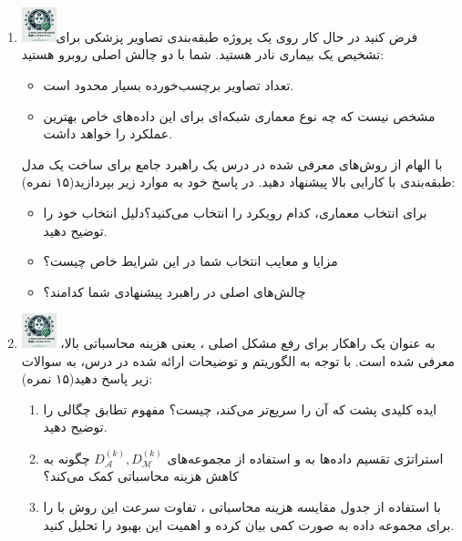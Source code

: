 \documentclass[12pt]{article}
\begin{document}
\begin{enumerate}
    \item \includegraphics[width=1cm]{figs/Allowed_recommended.jpg}فرض کنید در حال کار روی یک پروژه طبقه‌بندی تصاویر پزشکی برای تشخیص یک بیماری نادر هستید. شما با دو چالش اصلی روبرو هستید:
        \begin{itemize}
            \item تعداد تصاویر برچسب‌خورده بسیار محدود است.
            \item مشخص نیست که چه نوع معماری شبکه‌ای برای این داده‌های خاص بهترین عملکرد را خواهد داشت.
        \end{itemize}
        با الهام از روش‌های معرفی شده در درس یک راهبرد جامع برای ساخت یک مدل طبقه‌بندی با کارایی بالا پیشنهاد دهید. در پاسخ خود به موارد زیر بپردازید(۱۵ نمره):
        \begin{itemize}
            \item برای انتخاب معماری، کدام رویکرد را انتخاب می‌کنید؟دلیل انتخاب خود را توضیح دهید.
            \item مزایا و معایب انتخاب شما در این شرایط خاص چیست؟
            \item چالش‌های اصلی در راهبرد پیشنهادی شما کدامند؟
        \end{itemize}
        
    \item \includegraphics[width=1cm]{figs/Allowed_recommended.jpg} به عنوان یک راهکار برای رفع مشکل اصلی ، یعنی هزینه محاسباتی بالا، معرفی شده است. با توجه به الگوریتم و توضیحات ارائه شده در درس، به سوالات زیر پاسخ دهید(۱۵ نمره):
    \begin{enumerate}
        \item ایده کلیدی پشت  که آن را سریع‌تر می‌کند، چیست؟ مفهوم 
تطابق چگالی را توضیح دهید.
        \item استراتژی تقسیم داده‌ها به  و استفاده از مجموعه‌های $D_{\mathcal{A}}^{(k)}, D_{\mathcal{M}}^{(k)}$ چگونه به کاهش هزینه محاسباتی کمک می‌کند؟
        \item با استفاده از جدول مقایسه هزینه محاسباتی ، تفاوت سرعت این روش با  را برای مجموعه داده  به صورت کمی بیان کرده و اهمیت این بهبود را تحلیل کنید.
    \end{enumerate}



\end{enumerate}
\end{document}
